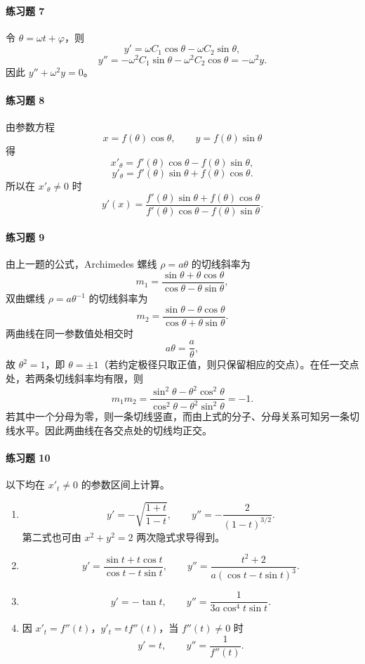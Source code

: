 \paragraph{练习题 7}
\begin{xsolution}
令 $\theta=\omega t+\varphi$，则
\[
  y'=\omega C_1\cos\theta-\omega C_2\sin\theta,
\]
\[
  y''=-\omega^2C_1\sin\theta-\omega^2C_2\cos\theta=-\omega^2y.
\]
因此 $y''+\omega^2y=0$。
\end{xsolution}

\paragraph{练习题 8}
\begin{xsolution}
由参数方程
\[
  x=f(\theta)\cos\theta,\qquad y=f(\theta)\sin\theta
\]
得
\[
  x'_\theta=f'(\theta)\cos\theta-f(\theta)\sin\theta,
\]
\[
  y'_\theta=f'(\theta)\sin\theta+f(\theta)\cos\theta.
\]
所以在 $x'_\theta\ne0$ 时
\[
  \boxed{y'(x)=\frac{f'(\theta)\sin\theta+f(\theta)\cos\theta}{f'(\theta)\cos\theta-f(\theta)\sin\theta}}.
\]
\end{xsolution}

\paragraph{练习题 9}
\begin{xsolution}
由上一题的公式，Archimedes 螺线 $\rho=a\theta$ 的切线斜率为
\[
  m_1=\frac{\sin\theta+\theta\cos\theta}{\cos\theta-\theta\sin\theta},
\]
双曲螺线 $\rho=a\theta^{-1}$ 的切线斜率为
\[
  m_2=\frac{\sin\theta-\theta\cos\theta}{\cos\theta+\theta\sin\theta}.
\]
两曲线在同一参数值处相交时
\[
  a\theta=\frac a\theta,
\]
故 $\theta^2=1$，即 $\theta=\pm1$（若约定极径只取正值，则只保留相应的交点）。在任一交点处，若两条切线斜率均有限，则
\[
  m_1m_2
  =\frac{\sin^2\theta-\theta^2\cos^2\theta}
  {\cos^2\theta-\theta^2\sin^2\theta}
  =-1.
\]
若其中一个分母为零，则一条切线竖直，而由上式的分子、分母关系可知另一条切线水平。因此两曲线在各交点处的切线均正交。
\end{xsolution}

\paragraph{练习题 10}
\begin{xsolution}
以下均在 $x'_t\ne0$ 的参数区间上计算。
\begin{enumerate}[label=(\arabic*)]
  \item
  \[
    \boxed{y'=-\sqrt{\frac{1+t}{1-t}}},
    \qquad
    \boxed{y''=-\frac2{(1-t)^{3/2}}}.
  \]
  第二式也可由 $x^2+y^2=2$ 两次隐式求导得到。
  \item
  \[
    \boxed{y'=\frac{\sin t+t\cos t}{\cos t-t\sin t}},
    \qquad
    \boxed{y''=\frac{t^2+2}{a(\cos t-t\sin t)^3}}.
  \]
  \item
  \[
    \boxed{y'=-\tan t},
    \qquad
    \boxed{y''=\frac1{3a\cos^4t\sin t}}.
  \]
  \item 因 $x'_t=f''(t)$，$y'_t=tf''(t)$，当 $f''(t)\ne0$ 时
  \[
    \boxed{y'=t},\qquad \boxed{y''=\frac1{f''(t)}}.
  \]
\end{enumerate}
\end{xsolution}

